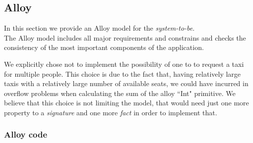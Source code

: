 \newpage
\subsection{Alloy} %
In this section we provide an Alloy model for the \emph{system-to-be}.\\
The Alloy model includes all major requirements and constrains and checks the consistency of the most important components of the application.

We explicitly chose not to implement the possibility of one \emph{} to to request a taxi for multiple people. This choice is due to the fact that, having relatively large taxis with a relatively large number of available seats, we could have incurred in overflow problems when calculating the sum of the alloy ``Int" primitive.
We believe that this choice is not limiting the model, that would need just one more property to a \emph{signature} and one more \emph{fact} in order to implement that.
\newpage

\subsubsection{Alloy code}




